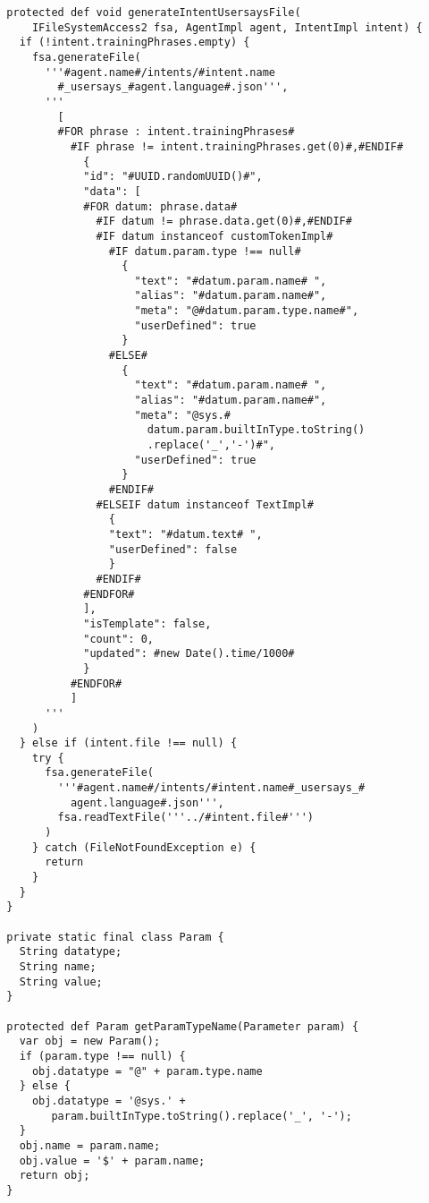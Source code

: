 \begin{lstlisting}
  protected def void generateIntentUsersaysFile(
      IFileSystemAccess2 fsa, AgentImpl agent, IntentImpl intent) {
    if (!intent.trainingPhrases.empty) {
      fsa.generateFile(
        '''#agent.name#/intents/#intent.name
          #_usersays_#agent.language#.json''',
        '''
          [
          #FOR phrase : intent.trainingPhrases#
            #IF phrase != intent.trainingPhrases.get(0)#,#ENDIF#
              {
              "id": "#UUID.randomUUID()#",
              "data": [
              #FOR datum: phrase.data#
                #IF datum != phrase.data.get(0)#,#ENDIF#
                #IF datum instanceof customTokenImpl#
                  #IF datum.param.type !== null#
                    {
                      "text": "#datum.param.name# ",
                      "alias": "#datum.param.name#",
                      "meta": "@#datum.param.type.name#",
                      "userDefined": true
                    }
                  #ELSE#
                    {
                      "text": "#datum.param.name# ",
                      "alias": "#datum.param.name#",
                      "meta": "@sys.#
                        datum.param.builtInType.toString()
                        .replace('_','-')#",
                      "userDefined": true
                    }
                  #ENDIF#
                #ELSEIF datum instanceof TextImpl#
                  {
                  "text": "#datum.text# ",
                  "userDefined": false
                  }
                #ENDIF#
              #ENDFOR#
              ],
              "isTemplate": false,
              "count": 0,
              "updated": #new Date().time/1000#
              }
            #ENDFOR#
            ]
        '''
      )
    } else if (intent.file !== null) {
      try {
        fsa.generateFile(
          '''#agent.name#/intents/#intent.name#_usersays_#
            agent.language#.json''',
          fsa.readTextFile('''../#intent.file#''')
        )
      } catch (FileNotFoundException e) {
        return
      }
    }
  }

  private static final class Param {
    String datatype;
    String name;
    String value;
  }

  protected def Param getParamTypeName(Parameter param) {
    var obj = new Param();
    if (param.type !== null) {
      obj.datatype = "@" + param.type.name
    } else {
      obj.datatype = '@sys.' +
         param.builtInType.toString().replace('_', '-');
    }
    obj.name = param.name;
    obj.value = '$' + param.name;
    return obj;
  }


\end{lstlisting}
